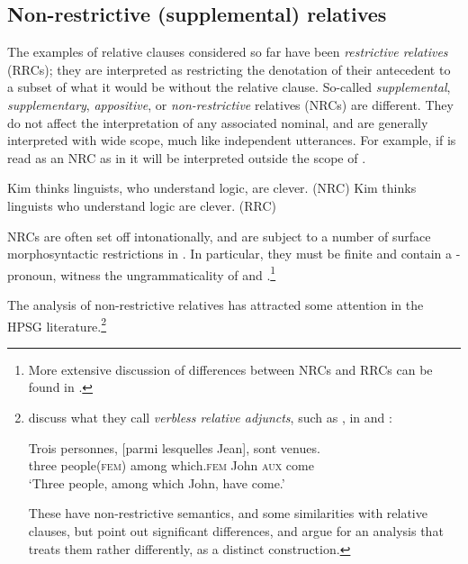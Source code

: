 \documentclass[output=paper,biblatex,babelshorthands,newtxmath,draftmode,colorlinks,citecolor=brown]{langscibook}
\begin{document}
\subsection{Non-restrictive (supplemental) relatives}
\label{sec:rc-non-restr-suppl}

The examples of relative clauses considered so far have been \emph{restrictive relatives} (RRCs); they are
interpreted as restricting the denotation of their antecedent to a subset of what
it would be without the relative clause. So-called \emph{supplemental}, \emph{supplementary}, \emph{appositive}, or \emph{non-restrictive}
relatives (NRCs) are different. They do not affect the interpretation of any associated
nominal, and are generally interpreted with wide scope, much like independent
utterances. For example, if  is read as an NRC as in 
it will be interpreted outside the scope of .
\begin{exe}\ex\begin{xlist}\label{x:rc-106}
  \ex\label{x:rc-107} Kim thinks linguists, who understand logic, are clever. \hfill (NRC)
  \ex\label{x:rc-108} Kim thinks linguists who understand logic are clever. \hfill (RRC)
\end{xlist}\end{exe}
NRCs are often set off intonationally, and are subject to a number of surface
morphosyntactic restrictions in .  In particular, they must be finite and contain a
-pronoun, witness the ungrammaticality of  and
.\footnote{More extensive discussion of differences between NRCs and RRCs can
  be found in .}
\begin{exe}\ex\begin{xlist}
\end{xlist}\end{exe}

The analysis of non-restrictive relatives has attracted some attention in the HPSG
literature.\footnote{\citet{BlbieLaurens09} discuss what they call \emph{verbless relative
  adjuncts}, such as , in  and :
\begin{exe}\ex\label{x:rc-111}
  \gll Trois personnes, [parmi lesquelles Jean], sont venues.\\
  three people(\textsc{fem}) \hphantom{[}among which.\textsc{fem} John \textsc{aux} come\\
  \glt `Three people, among which John, have come.’ 
\end{exe}
These have non-restrictive semantics, and some similarities with relative clauses, but
\citeauthor{BlbieLaurens09} point out significant differences, and argue for an analysis that
treats them rather differently, as a distinct construction.}
\end{document}
